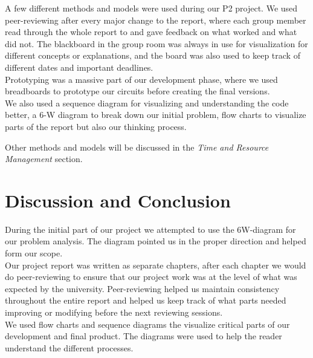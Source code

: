 A few different methods and models were used during our P2 project. We used peer-reviewing after every major change to the report, where each group member read through the whole report to and gave feedback on what worked and what did not. The blackboard in the group room was always in use for visualization for different concepts or explanations, and the board was also used to keep track of different dates and important deadlines.\\
Prototyping was a massive part of our development phase, where we used breadboards to prototype our circuits before creating the final versions.\\
We also used a sequence diagram for visualizing and understanding the code better, a 6-W diagram to break down our initial problem, flow charts to visualize parts of the report but also our thinking process.

Other methods and models will be discussed in the \textit{Time and Resource Management} section. 
\section{Discussion and Conclusion}

During the initial part of our project we attempted to use the 6W-diagram for our problem analysis. The diagram pointed us in the proper direction and helped form our scope.\\
Our project report was written as separate chapters, after each chapter we would do peer-reviewing to ensure that our project work was at the level of what was expected by the university. Peer-reviewing helped us maintain consistency throughout the entire report and helped us keep track of what parts needed improving or modifying before the next reviewing sessions.\\
We used flow charts and sequence diagrams the visualize critical parts of our development and final product. The diagrams were used to help the reader understand the different processes. 
